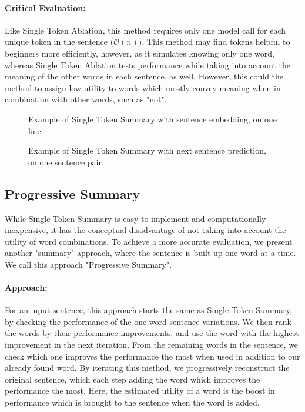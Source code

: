 \paragraph{Critical Evaluation:}
Like Single Token Ablation, this method requires only one model call for each unique token in the sentence ($\mathcal{O}(n)$).
This method may find tokens helpful to beginners more efficiently, however, as it simulates knowing only one word, whereas Single Token Ablation tests performance while taking into account the meaning of the other words in each sentence, as well.
However, this could the method to assign low utility to words which mostly convey meaning when in combination with other words, such as "not".

\begin{figure}[H]
	
	\caption{Example of Single Token Summary with sentence embedding, on one line.}
	\label{fig:single-token-summary}
\end{figure}

\begin{figure}[H]
	
	\caption{Example of Single Token Summary with next sentence prediction, on one sentence pair.}
	\label{fig:single-token-summary-nsp}
\end{figure}


\subsection{Progressive Summary}
While Single Token Summary is easy to implement and computationally inexpensive, it has the conceptual disadvantage of not taking into account the utility of word combinations.
To achieve a more accurate evaluation, we present another "summary" approach, where the sentence is built up one word at a time.
We call this approach "Progressive Summary".

\paragraph{Approach:}
For an input sentence, this approach starts the same as Single Token Summary, by checking the performance of the one-word sentence variations.
We then rank the words by their performance improvements, and use the word with the highest improvement in the next iteration.
From the remaining words in the sentence, we check which one improves the performance the most when used in addition to our already found word.
By iterating this method, we progressively reconstruct the original sentence, which each step adding the word which improves the performance the most.
Here, the estimated utility of a word is the boost in performance which is brought to the sentence when the word is added.

